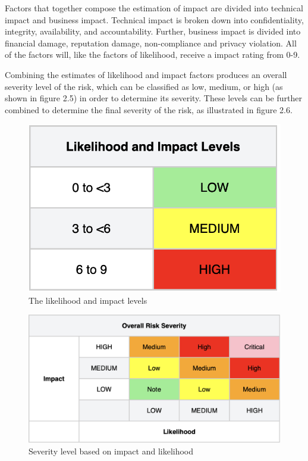 Factors that together compose the estimation of impact are divided into technical impact and business impact. Technical impact is broken down into confidentiality, integrity, availability, and accountability. Further, business impact is divided into financial damage, reputation damage, non-compliance and privacy violation. All of the factors will, like the factors of likelihood, receive a impact rating from 0-9. 

Combining the estimates of likelihood and impact factors produces an overall severity level of the risk, which can be classified as low, medium, or high (as shown in figure 2.5) in order to determine its severity. These levels can be further combined to determine the final severity of the risk, as illustrated in figure 2.6.\cite{owasprisk}

\begin{figure}[H]
    \centering
    \includegraphics[scale=0.5]{Images/OWASP-likelihood.png}
    \caption{The likelihood and impact levels}
    \label{fig:Impact levels}
\end{figure}

\begin{figure}[H]
    \centering
    \includegraphics[scale=0.4]{Images/OWASP-severity.png}
    \caption{Severity level based on impact and likelihood}
    \label{fig:OWASP Severity Scale}
\end{figure}
\newpage




